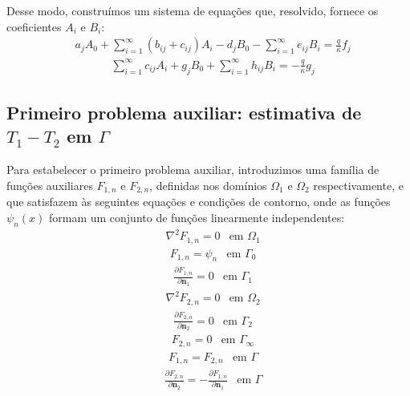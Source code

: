 Desse modo, construímos um sistema de equações que, resolvido, fornece os coeficientes $A_i$ e $B_i$:
\begin{align}	
	& a_j A_0 + \sum_{i=1}^\infty (b_{ij} + c_{ij}) A_i - d_j B_0 - \sum_{i=1}^\infty e_{ij}B_i = \frac{q}{\kappa} f_j \label{sist_A_B_1}
\end{align}
\begin{align}
	& \sum_{i=1}^\infty c_{ij} A_i + g_j B_0 + \sum_{i=1}^\infty h_{ij} B_i = -\frac{q}{\kappa}g_j \label{sist_A_B_2}
\end{align}
\subsection{Primeiro problema auxiliar: estimativa de $T_1 - T_2$ em $\Gamma$}\label{sec_repr_F}

Para estabelecer o primeiro problema auxiliar, introduzimos uma família de funções auxiliares $F_{1, n}$ e $F_{2, n}$, definidas
nos domínios $\Omega_1$ e $\Omega_2$ respectivamente, e que satisfazem às seguintes equações e condições de contorno, onde as funções
$\psi_n(x)$ formam um conjunto de funções linearmente independentes:
\begin{align}
	& \nabla^2 F_{1,n} = 0 & \text{em } \Omega_1 \label{harm_F1}
\end{align}
\begin{align}	
	& F_{1,n} = \psi_n & \text{em } \Gamma_0
\end{align}
\begin{align}	
	& \frac{\partial F_{1,n}}{\partial \mathbf{n}_1} = 0 & \text{em } \Gamma_1 \label{cc_F1_1}
\end{align}
\begin{align}
	& \nabla^2 F_{2,n} = 0 & \text{em } \Omega_2 \label{harm_F2}
\end{align}
\begin{align}	
	& \frac{\partial F_{2,n}}{\partial \mathbf{n}_2} = 0 & \text{em } \Gamma_2 \label{cc_F1_2}
\end{align}
\begin{align}
	& F_{2,n} = 0 & \text{em } \Gamma_\infty \label{cc_F1_3}
\end{align}
\begin{align}
	& F_{1,n} = F_{2,n} & \text{em } \Gamma \label{cc_F1_4}
\end{align}
\begin{align}
	& \frac{\partial F_{2,n}}{\partial\mathbf{n}_2} = -\frac{\partial F_{1,n}}{\partial\mathbf{n}_1} & \text{em } \label{cc_F1_5} \Gamma 
\end{align}

